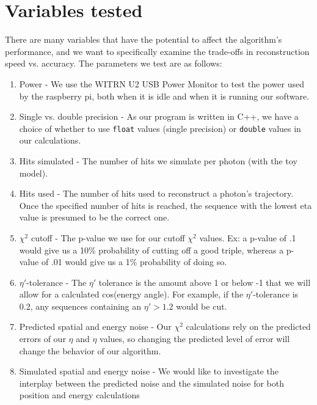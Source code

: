 \section{Variables tested}
There are many variables that have the potential to affect the algorithm's performance, and we want to specifically examine the trade-offs in reconstruction speed vs. accuracy. The parameters we test are as follows:

\begin{enumerate}
    \item Power - We use the WITRN U2 USB Power Monitor to test the power used by the raspberry pi, both when it is idle and when it is running our software.
    \item Single vs. double precision - As our program is written in C++, we have a choice of whether to use \texttt{float} values (single precision) or \texttt{double} values in our calculations.
    \item Hits simulated - The number of hits we simulate per photon (with the toy model).
    \item Hits used - The number of hits used to reconstruct a photon's trajectory. Once the specified number of hits is reached, the sequence with the lowest eta value is presumed to be the correct one.
    \item $\chi^2$ cutoff - The p-value we use for our cutoff $\chi^2$ values. Ex: a p-value of .1 would give us a 10\% probability of cutting off a good triple, whereas a p-value of .01 would give us a 1\% probability of doing so.
    \item $\eta'$-tolerance - The $\eta'$ tolerance is the amount above 1 or below -1 that we will allow for a calculated cos(energy angle). For example, if the $\eta'$-tolerance is 0.2, any sequences containing an $\eta' > 1.2$ would be cut.
    \item Predicted spatial and energy noise - Our $\chi^2$ calculations rely on the predicted errors of our $\eta$ and $\eta$ values, so changing the predicted level of error will change the behavior of our algorithm.
    \item Simulated spatial and energy noise - We would like to investigate the interplay between the predicted noise and the simulated noise for both position and energy calculations
\end{enumerate}